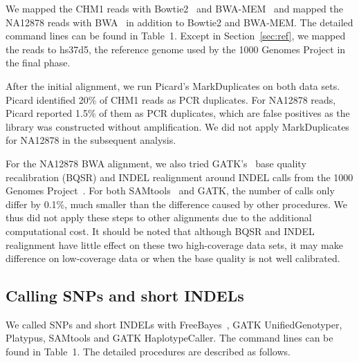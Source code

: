 \documentclass{bioinfo}
\begin{document}
\begin{methods}
We mapped the CHM1 reads with Bowtie2~\citep{Langmead:2012fk} and
BWA-MEM~\citep{Li:2013aa} and mapped the NA12878 reads with
BWA~\citep{Li:2009uq} in addition to Bowtie2 and BWA-MEM. The detailed command
lines can be found in Table~1. Except in Section~\ref{sec:ref}, we mapped the
reads to hs37d5, the reference genome used by the 1000 Genomes Project in the
final phase.

After the initial alignment, we run Picard's MarkDuplicates on both data sets.
Picard identified 20\% of CHM1 reads as PCR duplicates. For NA12878 reads,
Picard reported 1.5\% of them as PCR duplicates, which are false positives as
the library was constructed without amplification. We did not apply
MarkDuplicates for NA12878 in the subsequent analysis.

For the NA12878 BWA alignment, we also tried GATK's~\citep{Depristo:2011vn}
base quality recalibration (BQSR) and INDEL realignment around INDEL calls from
the 1000 Genomes Project~\citep{1000g:2012aa}. For both
SAMtools~\citep{Li:2011ab} and GATK, the number of calls only differ by 0.1\%,
much smaller than the difference caused by other procedures. We thus did not
apply these steps to other alignments due to the additional computational cost.
It should be noted that although BQSR and INDEL realignment have little effect
on these two high-coverage data sets, it may make difference on low-coverage
data or when the base quality is not well calibrated.

\subsection{Calling SNPs and short INDELs}

We called SNPs and short INDELs with FreeBayes~\citep{Garrison:2012aa}, GATK
UnifiedGenotyper, Platypus, SAMtools and GATK HaplotypeCaller. The command
lines can be found in Table~1. The detailed procedures are described as
follows.


\end{methods}
\end{document}
